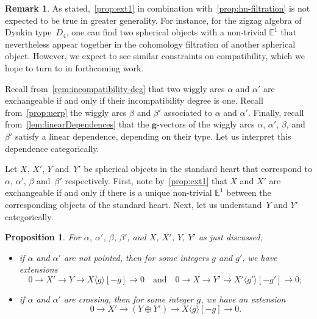 \documentclass{amsart}
\newtheorem{proposition}[theorem]{Proposition}
\theoremstyle{definition}
\newtheorem{remark}[theorem]{Remark}
\renewcommand{\b}[1]{{\boldsymbol{#1}}} %
\begin{document}
\begin{remark}
  As stated,~\cref{prop:ext1} in combination with~\cref{prop:hn-filtration} is not expected to be true in greater generality.
  For instance, for the zigzag algebra of Dynkin type~\(D_4\), one can find two spherical objects with a non-trivial \(\mathbb{E}^1\) that nevertheless appear together in the cohomology filtration of another spherical object.
  However, we expect to see similar constraints on compatibility, which we hope to turn to in forthcoming work.
\end{remark}

Recall from~\cref{rem:incompatibility-deg} that two wiggly arcs \(\alpha\) and \(\alpha'\) are exchangeable if and only if their incompatibility degree is one.
Recall from~\cref{prop:uerp} the wiggly arcs \(\beta\) and \(\beta'\) associated to \(\alpha\) and \(\alpha'\).
Finally, recall from~\cref{lem:linearDependences} that the \(\b{g}\)-vectors of the wiggly arcs \(\alpha\), \(\alpha'\), \(\beta\), and \(\beta'\) satisfy a linear dependence, depending on their type.
Let us interpret this dependence categorically.

Let \(X\), \(X'\), \(Y\) and~\(Y'\) be spherical objects in the standard heart that correspond to \(\alpha\), \(\alpha'\), \(\beta\) and~\(\beta'\) respectively.
First, note by~\cref{prop:ext1} that \(X\) and \(X'\) are exchangeable if and only if there is a unique non-trivial \(\mathbb{E}^1\) between the corresponding objects of the standard heart.
Next, let us understand~\(Y\) and \(Y'\) categorically.

\begin{proposition}\label{prop:extensions}
For \(\alpha\), \(\alpha'\), \(\beta\), \(\beta'\), and \(X\), \(X'\), \(Y\), \(Y'\) as just discussed,
\begin{itemize}
\item if \(\alpha\) and \(\alpha'\) are not pointed, then for some integers \(g\) and \(g'\), we have extensions
  \[0 \to X' \to Y \to X\langle g \rangle[-g] \to 0 \quad \text{and}\quad 0 \to X \to Y' \to X'\langle g' \rangle[-g'] \to 0;\]
\item if \(\alpha\) and \(\alpha'\) are crossing, then for some integer \(g\), we have an extension
  \[0 \to X' \to (Y \oplus Y') \to X\langle g \rangle[-g]\to 0.\]
\end{itemize}
\end{proposition}
\end{document}
